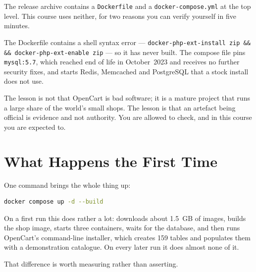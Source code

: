 \begin{alertbox}
The release archive contains a \texttt{Dockerfile} and a
\texttt{docker-compose.yml} at the top level. This course uses neither, for two
reasons you can verify yourself in five minutes.

\smallskip
The Dockerfile contains a shell syntax error --- \texttt{docker-php-ext-install
zip \&\& \&\& docker-php-ext-enable zip} --- so it has never built. The compose
file pins \texttt{mysql:5.7}, which reached end of life in October~2023 and
receives no further security fixes, and starts Redis, Memcached and PostgreSQL
that a stock install does not use.

\smallskip
The lesson is not that OpenCart is bad software; it is a mature project that
runs a large share of the world's small shops. The lesson is that an artefact
being official is evidence and not authority. You are allowed to check, and in
this course you are expected to.
\end{alertbox}

\section{What Happens the First Time}

One command brings the whole thing up:

\begin{lstlisting}[language=bash]
docker compose up -d --build
\end{lstlisting}

On a first run this does rather a lot: downloads about 1.5~GB of images, builds
the shop image, starts three containers, waits for the database, and then runs
OpenCart's command-line installer, which creates 159 tables and populates them
with a demonstration catalogue. On every later run it does almost none of it.

That difference is worth measuring rather than asserting.

